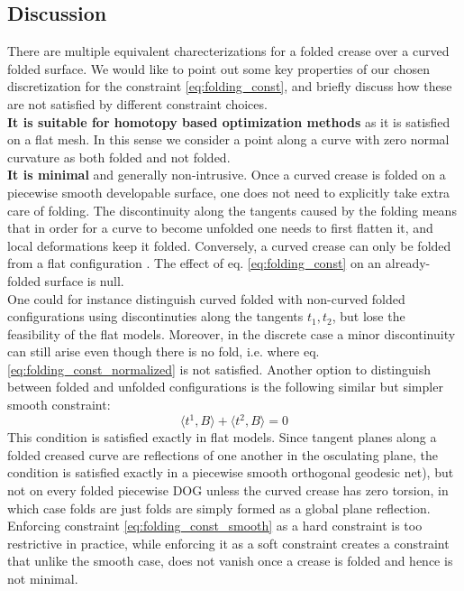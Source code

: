 \subsection{Discussion}
There are multiple equivalent charecterizations for a folded crease over a curved folded surface. We would like to point out some key properties of our chosen discretization for the constraint \eqref{eq:folding_const}, and briefly discuss how these are not satisfied by different constraint choices. \\
\textbf{It is suitable for homotopy based optimization methods} as it is satisfied on a flat mesh. In this sense we consider a point along a curve with zero normal curvature as both folded and not folded. \\ 
\textbf{It is minimal} and generally non-intrusive. Once a curved crease is folded on a piecewise smooth developable surface, one does not need to explicitly take extra care of folding. The discontinuity along the tangents caused by the folding means that in order for a curve to become unfolded one needs to first flatten it, and local deformations keep it folded. Conversely, a curved crease can only be folded from a flat configuration \cite{more_on_paper}. The effect of eq. \eqref{eq:folding_const} on an already-folded surface is null. \\
One could for instance distinguish curved folded with non-curved folded configurations using discontinuties along the tangents $t_1,t_2$, but lose the feasibility of the flat models. Moreover, in the discrete case a minor discontinuity can still arise even though there is no fold, i.e. where eq. \eqref{eq:folding_const_normalized} is not satisfied. Another option to distinguish between folded and unfolded configurations is the following similar but simpler smooth constraint:
\begin{equation} \label{eq:folding_const_smooth} 
\langle t^1,B\rangle + \langle t^2,B\rangle = 0
\end{equation}
This condition is satisfied exactly in flat models. Since tangent planes along a folded creased curve are reflections of one another in the osculating plane, the condition is satisfied exactly in a piecewise smooth orthogonal geodesic net), but not on every folded piecewise DOG unless the curved crease has zero torsion, in which case folds are just folds are simply formed as a global plane reflection. Enforcing constraint \eqref{eq:folding_const_smooth} as a hard constraint is too restrictive in practice, while enforcing it as a soft constraint creates a constraint that unlike the smooth case, does not vanish once a crease is folded and hence is not minimal.


